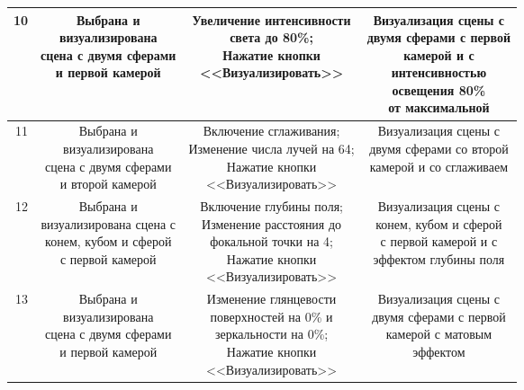 \begin{longtable}{|r|c|c|c|}
	10 & \makecell{Выбрана и \\визуализирована \\сцена с двумя сферами\\и первой камерой} & \makecell{Увеличение интенсивности \\света до 80\%;\\Нажатие кнопки\\<<Визуализировать>>} & \makecell{Визуализация сцены с \\двумя сферами с первой\\камерой и с \\интенсивностью\\ освещения 80\% \\от максимальной} \\ \hline
	11 & \makecell{Выбрана и \\визуализирована \\сцена с двумя сферами\\и второй камерой} & \makecell{Включение сглаживания;\\Изменение числа лучей на 64;\\Нажатие кнопки\\<<Визуализировать>>} & \makecell{Визуализация сцены с \\двумя сферами со второй\\камерой и со сглаживаем} \\ \hline
	12 & \makecell{Выбрана и \\визуализирована сцена с \\конем, кубом и сферой\\ с первой камерой} & \makecell{Включение глубины поля;\\Изменение расстояния до\\фокальной точки на 4;\\Нажатие кнопки\\<<Визуализировать>>} & \makecell{Визуализация сцены с \\конем, кубом и сферой\\ с первой камерой и с \\эффектом глубины поля} \\ \hline
	13 & \makecell{Выбрана и \\визуализирована \\сцена с двумя сферами\\и первой камерой} & \makecell{Изменение глянцевости\\поверхностей на 0\% и \\ зеркальности на 0\%;\\Нажатие кнопки\\<<Визуализировать>>} & \makecell{Визуализация сцены с \\двумя сферами с первой\\камерой с матовым\\ эффектом} \\ \hline

\end{longtable}
